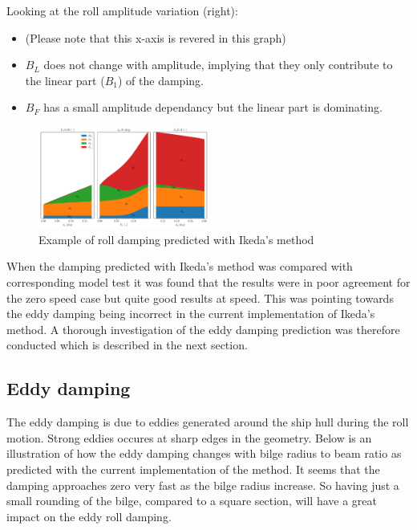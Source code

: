 Looking at the roll amplitude variation (right):

\begin{itemize}
\item (Please note that this x-axis is revered in this graph)
\item $B_L$ does not change with amplitude, implying that they only contribute to the linear part ($B_1$) of the damping.
\item $B_F$ has a small amplitude dependancy but the linear part is dominating.
\end{itemize}

    

    
    \begin{figure}[H]
        \begin{center}\includegraphics[width = 0.5\textwidth]{figures/ikeda_generic.pdf}\end{center}
        \vspace{-1cm}
        \caption{Example of roll damping predicted with Ikeda's method}
        \label{fig:ikeda_generic}
    \end{figure}
    
    When the damping predicted with Ikeda's method was compared with
corresponding model test it was found that the results were in poor
agreement for the zero speed case but quite good results at speed. This
was pointing towards the eddy damping being incorrect in the current
implementation of Ikeda's method. A thorough investigation of the eddy
damping prediction was therefore conducted which is described in the
next section.

    \subsection*{Eddy damping}\label{eddy-damping}

The eddy damping is due to eddies generated around the ship hull during
the roll motion. Strong eddies occures at sharp edges in the geometry.
Below is an illustration of how the eddy damping changes with bilge
radius to beam ratio as predicted with the current implementation of the
method. It seems that the damping approaches zero very fast as the bilge
radius increase. So having just a small rounding of the bilge, compared
to a square section, will have a great impact on the eddy roll damping.


